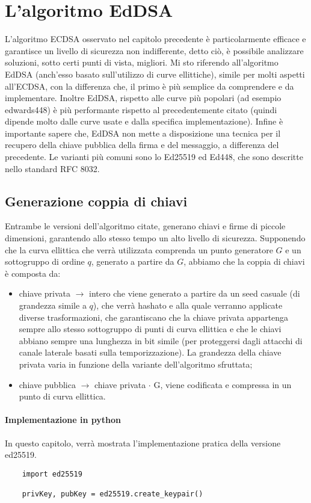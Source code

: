 \chapter{L'algoritmo EdDSA}

L'algoritmo ECDSA osservato nel capitolo precedente è particolarmente efficace e garantisce un livello di sicurezza non indifferente, detto ciò, è possibile analizzare soluzioni, sotto certi punti di vista, migliori. Mi sto riferendo all'algoritmo EdDSA  (anch'esso basato sull'utilizzo di curve ellittiche), simile per molti aspetti all'ECDSA, con la differenza che, il primo è più semplice da comprendere e da implementare. Inoltre EdDSA, rispetto alle curve più popolari (ad esempio edwards448) è più performante rispetto al precedentemente citato (quindi dipende molto dalle curve usate e dalla specifica implementazione). Infine è importante sapere che, EdDSA non mette a disposizione una tecnica per il recupero della chiave pubblica della firma e del messaggio, a differenza del precedente. Le varianti più comuni sono lo Ed25519 ed Ed448, che sono descritte nello standard RFC 8032.

\section{Generazione coppia di chiavi}

Entrambe le versioni dell'algoritmo citate, generano chiavi e firme di piccole dimensioni, garantendo allo stesso tempo un alto livello di sicurezza. Supponendo che la curva ellittica che verrà utilizzata comprenda un punto generatore $G$ e un sottogruppo di ordine $q$, generato a partire da $G$, abbiamo che la coppia di chiavi è composta da:

\begin{itemize}
	\item chiave privata $\rightarrow$ intero che viene generato a partire da un seed casuale (di grandezza simile a $q$), che verrà hashato e alla quale verranno applicate diverse trasformazioni, che garantiscano che la chiave privata appartenga sempre allo stesso sottogruppo di punti di curva ellittica e che le chiavi abbiano sempre una lunghezza in bit simile (per proteggersi dagli attacchi di canale laterale basati sulla temporizzazione). La grandezza della chiave privata varia in funzione della variante dell'algoritmo sfruttata;
	\item chiave pubblica $\rightarrow$ chiave privata $\cdot$ G, viene codificata e compressa in un punto di curva ellittica.
\end{itemize}

\subsubsection{Implementazione in python}

In questo capitolo, verrà mostrata l'implementazione pratica della versione ed25519.

\begin{lstlisting}
	import ed25519
	
	privKey, pubKey = ed25519.create_keypair()
\end{lstlisting}
